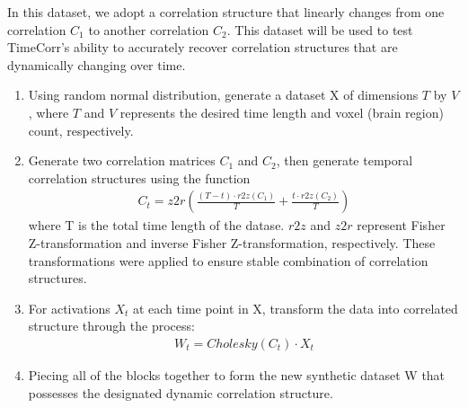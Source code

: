 \documentclass[11pt]{article}
\begin{document}
In this dataset, we adopt a correlation structure that linearly changes from one correlation $C_1$ to another correlation $C_2$. This dataset will be used to test TimeCorr's ability to accurately recover correlation structures that are dynamically changing over time.

\begin{enumerate}
\item Using random normal distribution, generate a dataset X of dimensions $T$ by $V$, where $T$ and $V$ represents the desired time length and voxel (brain region) count, respectively.
\item Generate two correlation matrices $C_1$ and $C_2$, then generate temporal correlation structures using the function
\begin{align*}
C_t = z2r(\frac{(T-t) \cdot r2z(C_1)}{T} + \frac{t\cdot r2z(C_2)}{T})
\end{align*}
where T is the total time length of the datase. $r2z$ and $z2r$ represent Fisher Z-transformation and inverse Fisher Z-transformation, respectively. These transformations were applied to ensure stable combination of correlation structures.
\item For activations $X_t$ at each time point in X, transform the data into correlated structure through the process:
\begin{align*}
W_t = Cholesky(C_t) \cdot X_t
\end{align*}
\item Piecing all of the blocks together to form the new synthetic dataset W that possesses the designated dynamic correlation structure.
\end{enumerate}
\end{document}
